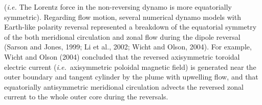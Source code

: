 ({\it i.e.} The Lorentz force in the non-reversing dynamo is more equatorially symmetric).
Regarding flow motion, several numerical dynamo models with Earth-like polarity reversal represented a breakdown of the equatorial symmetry of the both meridional circulation and zonal flow during the dipole reversal 
(Sarson and Jones, 1999;
Li et al., 2002; %
Wicht and Olson, 2004). %
For example,
Wicht and Olson (2004) concluded that the reversed axisymmetric toroidal electric current ({\it i.e.}\ axisymmetric poloidal magnetic field) is generated near the outer boundary and tangent cylinder by the plume with upwelling flow, and that equatorially antisymmetric meridional circulation advects the reversed zonal current to the whole outer core during the reversals.

